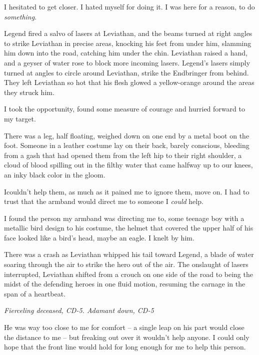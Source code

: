 I hesitated to get closer.  I hated myself for doing it.  I was here for a reason, to do \emph{something}.



Legend fired a salvo of lasers at Leviathan, and the beams turned at right angles to strike Leviathan in precise areas, knocking his feet from under him, slamming him down into the road, catching him under the chin.  Leviathan raised a hand, and a geyser of water rose to block more incoming lasers.  Legend's lasers simply turned at angles to circle around Leviathan, strike the Endbringer from behind.  They left Leviathan so hot that his flesh glowed a yellow-orange around the areas they struck him.



I took the opportunity, found some measure of courage and hurried forward to my target.



There was a leg, half floating, weighed down on one end by a metal boot on the foot.  Someone in a leather costume lay on their back, barely conscious, bleeding from a gash that had opened them from the left hip to their right shoulder, a cloud of blood spilling out in the filthy water that came halfway up to our knees, an inky black color in the gloom.



Icouldn't help them, as much as it pained me to ignore them, move on.  I had to trust that the armband would direct me to someone I \emph{could} help.



I found the person my armband was directing me to, some teenage boy with a metallic bird design to his costume, the helmet that covered the upper half of his face looked like a bird's head, maybe an eagle.  I knelt by him.



There was a crash as Leviathan whipped his tail toward Legend, a blade of water soaring through the air to strike the hero out of the air.  The onslaught of lasers interrupted, Leviathan shifted from a crouch on one side of the road to being the midst of the defending heroes in one fluid motion, resuming the carnage in the span of a heartbeat.



\emph{Fierceling deceased, CD-5.  Adamant down, CD-5}



He was way too close to me for comfort – a single leap on his part would close the distance to me – but freaking out over it wouldn't help anyone.  I could only hope that the front line would hold for long enough for me to help this person.




